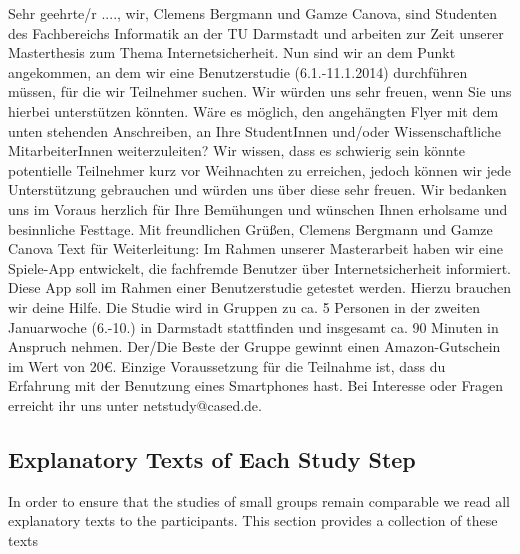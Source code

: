 Sehr geehrte/r ....,
\newline
\newline
wir, Clemens Bergmann und Gamze Canova, sind Studenten des Fachbereichs Informatik an der TU Darmstadt und arbeiten zur Zeit unserer Masterthesis zum Thema Internetsicherheit.
\newline
\newline
Nun sind wir an dem Punkt angekommen, an dem wir eine Benutzerstudie (6.1.-11.1.2014) durchf\"{u}hren m\"{u}ssen, f\"{u}r die wir Teilnehmer suchen. Wir w\"{u}rden uns sehr freuen, wenn Sie uns hierbei unterst\"{u}tzen k\"{o}nnten. W\"{a}re es m\"{o}glich, den angeh\"{a}ngten Flyer mit dem unten stehenden Anschreiben, an Ihre StudentInnen und/oder Wissenschaftliche MitarbeiterInnen  weiterzuleiten? Wir wissen, dass es schwierig sein k\"{o}nnte potentielle Teilnehmer kurz vor Weihnachten zu erreichen, jedoch k\"{o}nnen wir jede Unterst\"{u}tzung gebrauchen und w\"{u}rden uns \"{u}ber diese sehr freuen.
\newline
\newline
Wir bedanken uns im Voraus herzlich f\"{u}r Ihre Bem\"{u}hungen und w\"{u}nschen Ihnen erholsame und besinnliche Festtage.
\newline
\newline
Mit freundlichen Gr\"{u}{\ss}en, \newline
Clemens Bergmann und Gamze Canova
\newline
\newline
Text f\"{u}r Weiterleitung:
Im Rahmen unserer Masterarbeit haben wir eine Spiele-App entwickelt, die fachfremde Benutzer \"{u}ber Internetsicherheit informiert.  Diese App soll im Rahmen einer Benutzerstudie getestet werden. Hierzu brauchen wir deine Hilfe. Die Studie wird in Gruppen zu ca. 5 Personen in der zweiten Januarwoche (6.-10.) in Darmstadt stattfinden und insgesamt ca. 90 Minuten in Anspruch nehmen.  Der/Die Beste der Gruppe gewinnt einen Amazon-Gutschein im Wert von 20\euro.  Einzige Voraussetzung f\"{u}r die Teilnahme ist, dass du Erfahrung mit der Benutzung eines Smartphones hast. Bei Interesse oder Fragen erreicht ihr uns unter netstudy@cased.de. 




\subsection{Explanatory Texts of Each Study Step}
In order to ensure that the studies of small groups remain comparable we read all explanatory texts to the participants. 
This section provides a collection of these texts

